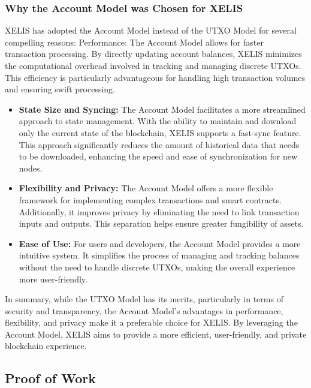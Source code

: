 \documentclass[12pt,a4paper,twocolumn]{article}
\begin{document}
\subsubsection{Why the Account Model was Chosen for XELIS}

XELIS has adopted the Account Model instead of the UTXO Model for several compelling reasons:
Performance: The Account Model allows for faster transaction processing. By directly updating account balances, XELIS minimizes the computational overhead involved in tracking and managing discrete UTXOs. This efficiency is particularly advantageous for handling high transaction volumes and ensuring swift processing.\\
\begin{itemize}
\item \textbf{State Size and Syncing:} The Account Model facilitates a more streamlined approach to state management. With the ability to maintain and download only the current state of the blockchain, XELIS supports a fast-sync feature. This approach significantly reduces the amount of historical data that needs to be downloaded, enhancing the speed and ease of synchronization for new nodes.\\

\item \textbf{Flexibility and Privacy:} The Account Model offers a more flexible framework for implementing complex transactions and smart contracts. Additionally, it improves privacy by eliminating the need to link transaction inputs and outputs. This separation helps ensure greater fungibility of assets.\\

\item \textbf{Ease of Use:} For users and developers, the Account Model provides a more intuitive system. It simplifies the process of managing and tracking balances without the need to handle discrete UTXOs, making the overall experience more user-friendly.\\
\end{itemize}
In summary, while the UTXO Model has its merits, particularly in terms of security and transparency, the Account Model's advantages in performance, flexibility, and privacy make it a preferable choice for XELIS. By leveraging the Account Model, XELIS aims to provide a more efficient, user-friendly, and private blockchain experience.\\

\subsection{Proof of Work}
\end{document}
